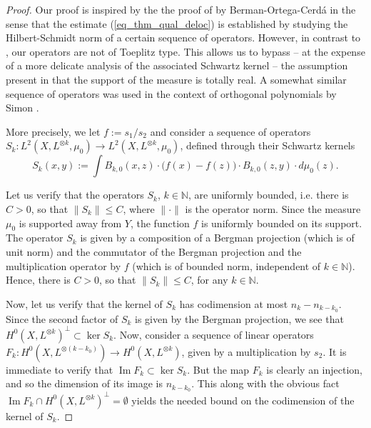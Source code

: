 \documentclass[12pt]{article}
\numberwithin{equation}{section}
\theoremstyle{theorem}
\theoremstyle{definition}
\theoremstyle{remark}
\newcommand{\nat}{\mathbb{N}}
\renewcommand{\Im}{\operatorname{Im}}
\begin{document}
	\begin{proof}
		Our proof is inspired by the the proof of \cite[Theorem 17]{BermanOrtega} by Berman-Ortega-Cerdá in the sense that the estimate (\ref{eq_thm_qual_deloc}) is established by studying the Hilbert-Schmidt norm of a certain sequence of operators.
		However, in contrast to \cite{BermanOrtega}, our operators are not of Toeplitz type. 
		This allows us to bypass -- at the expense of a more delicate analysis of the associated Schwartz kernel -- the assumption present in \cite{BermanOrtega} that the support of the measure is totally real.
		A somewhat similar sequence of operators was used in the context of orthogonal polynomials by Simon \cite{SimonWeakConv}.
		\par 
		More precisely, we let $f := s_1/s_2$ and consider a sequence of operators $S_k: L^2(X, L^{\otimes k}, \mu_0) \to L^2(X, L^{\otimes k}, \mu_0)$, defined through their Schwartz kernels
		\begin{equation}\label{eq_sk_sch1}
			S_k(x, y) := \int B_{k, 0}(x, z) \cdot \big( f(x) - f(z) \big) \cdot B_{k, 0}(z, y) \cdot d \mu_0(z).
		\end{equation}
		\par 
		Let us verify that the operators $S_k$, $k \in \nat$, are uniformly bounded, i.e. there is $C > 0$, so that $\| S_k \| \leq C$, where $\| \cdot \|$ is the operator norm.
		Since the measure $\mu_0$ is supported away from $Y$, the function $f$ is uniformly bounded on its support.
		The operator $S_k$ is given by a composition of a Bergman projection (which is of unit norm) and the commutator of the Bergman projection and the multiplication operator by $f$ (which is of bounded norm, independent of $k \in \nat$).
		Hence, there is $C > 0$, so that $\| S_k \| \leq C$, for any $k \in \nat$.
		\par 
		Now, let us verify that the kernel of $S_k$ has codimension at most $n_k - n_{k - k_0}$.
		Since the second factor of $S_k$ is given by the Bergman projection, we see that $H^0(X, L^{\otimes k})^{\perp} \subset \ker S_k$.
		Now, consider a sequence of linear operators $F_k : H^0(X, L^{\otimes (k - k_0)}) \to H^0(X, L^{\otimes k})$, given by a multiplication by $s_2$.
		It is immediate to verify that $\Im F_k \subset \ker S_k$.
		But the map $F_k$ is clearly an injection, and so the dimension of its image is $n_{k - k_0}$.
		This along with the obvious fact $\Im F_k \cap H^0(X, L^{\otimes k})^{\perp} = \emptyset$ yields the needed bound on the codimension of the kernel of $S_k$.
		\par 

\end{proof}
\end{document}
